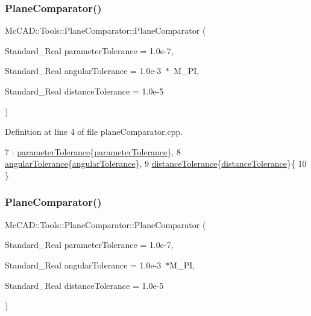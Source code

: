 \subsubsection{\texorpdfstring{Plane\+Comparator()}{PlaneComparator()}\hspace{0.1cm}{\footnotesize\ttfamily [1/2]}}
{\footnotesize\ttfamily Mc\+C\+A\+D\+::\+Tools\+::\+Plane\+Comparator\+::\+Plane\+Comparator (\begin{DoxyParamCaption}\item[{Standard\+\_\+\+Real}]{parameter\+Tolerance = {\ttfamily 1.0e-\/7},  }\item[{Standard\+\_\+\+Real}]{angular\+Tolerance = {\ttfamily 1.0e-\/3~$\ast$~M\+\_\+PI},  }\item[{Standard\+\_\+\+Real}]{distance\+Tolerance = {\ttfamily 1.0e-\/5} }\end{DoxyParamCaption})}



Definition at line 4 of file plane\+Comparator.\+cpp.


\begin{DoxyCode}
7     : \hyperlink{classMcCAD_1_1Tools_1_1PlaneComparator_adef35ba390ab77e8e03eadec54a87d5d}{parameterTolerance}\{\hyperlink{classMcCAD_1_1Tools_1_1PlaneComparator_adef35ba390ab77e8e03eadec54a87d5d}{parameterTolerance}\},
8       \hyperlink{classMcCAD_1_1Tools_1_1PlaneComparator_a7a12aa43a017dfa6242fc51d87310232}{angularTolerance}\{\hyperlink{classMcCAD_1_1Tools_1_1PlaneComparator_a7a12aa43a017dfa6242fc51d87310232}{angularTolerance}\},
9       \hyperlink{classMcCAD_1_1Tools_1_1PlaneComparator_a6e41cff0b95b5a5aa18de33ee9925e04}{distanceTolerance}\{\hyperlink{classMcCAD_1_1Tools_1_1PlaneComparator_a6e41cff0b95b5a5aa18de33ee9925e04}{distanceTolerance}\}\{
10 \}
\end{DoxyCode}
\mbox{\label{classMcCAD_1_1Tools_1_1PlaneComparator_a01aad597a147022419ddbb4625c6370d}} 
\subsubsection{\texorpdfstring{Plane\+Comparator()}{PlaneComparator()}\hspace{0.1cm}{\footnotesize\ttfamily [2/2]}}
{\footnotesize\ttfamily Mc\+C\+A\+D\+::\+Tools\+::\+Plane\+Comparator\+::\+Plane\+Comparator (\begin{DoxyParamCaption}\item[{Standard\+\_\+\+Real}]{parameter\+Tolerance = {\ttfamily 1.0e-\/7},  }\item[{Standard\+\_\+\+Real}]{angular\+Tolerance = {\ttfamily 1.0e-\/3~$\ast$M\+\_\+PI},  }\item[{Standard\+\_\+\+Real}]{distance\+Tolerance = {\ttfamily 1.0e-\/5} }\end{DoxyParamCaption})}



